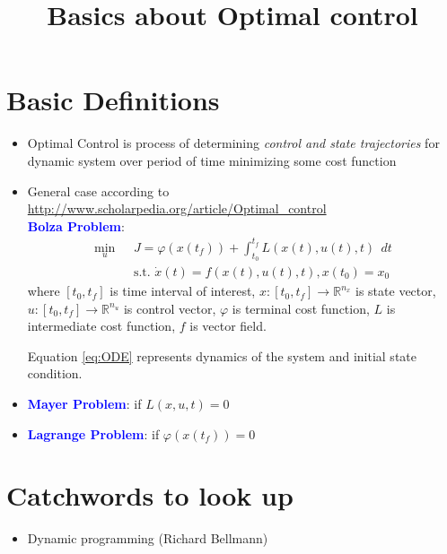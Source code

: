 \documentclass{article}
\title{\textbf{Basics about Optimal control}}
\date{}
\begin{document}
\maketitle

\section{Basic Definitions}
\begin{itemize}
\item Optimal Control is process of determining \textit{control and state trajectories} for dynamic system over period of time minimizing some cost function
\item General case according to \url{http://www.scholarpedia.org/article/Optimal_control}\\
\textbf{\textcolor{blue}{Bolza Problem}}:
\begin{align}
\min_{u} ~~~ & J = \varphi(x(t_f)) + \int_{t_0}^{t_f} L(x(t), u(t),t) ~~ dt \label{eq:obj}\\
&\text{s.t. } \dot{x}(t) = f(x(t),u(t),t),  x(t_0) = x_0 \label{eq:ODE}
\end{align}
where $[t_0,t_f]$ is time interval of interest, $x:[t_0,t_f]\rightarrow \mathbb{R}^{n_x}$ is state vector, $u:[t_0,t_f]\rightarrow \mathbb{R}^{n_u}$ is control vector, $\varphi$ is terminal cost function, $L$ is intermediate cost function, $f$ is vector field.

Equation \eqref{eq:ODE} represents dynamics of the system and initial state condition.

\item \textbf{\textcolor{blue}{Mayer Problem}}: if $L(x,u,t)=0$
\item \textbf{\textcolor{blue}{Lagrange Problem}}: if $\varphi(x(t_f))=0$
\end{itemize}

\section{Catchwords to look up}
\begin{itemize}
\item Dynamic programming (Richard Bellmann)
\end{itemize}
\end{document}
